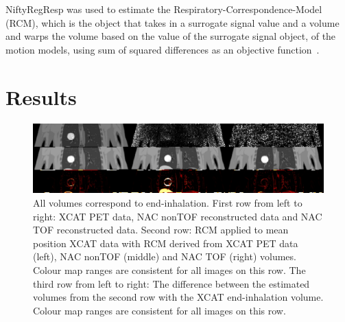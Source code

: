 \documentclass{IEEEtran}
\begin{document}
NiftyRegResp was used to estimate the Respiratory-Correspondence-Model (RCM), which is the object that takes in a surrogate signal value and a volume and warps the volume based on the value of the surrogate signal object, of the motion models, using sum of squared differences as an objective function~\cite{McClelland2017}.

\vspace{-0.2cm}

\section{Results}
\begin{figure}
    \vspace{-0.2cm}
    
    \centering
    \includegraphics[width=0.9\linewidth]{figures/output_flipped.png}
    \caption{All volumes correspond to end-inhalation. First row from left to right: XCAT PET data, NAC nonTOF reconstructed data and NAC TOF reconstructed data. Second row: RCM applied to mean position XCAT data with RCM derived from XCAT PET data (left), NAC nonTOF (middle) and NAC TOF (right) volumes. Colour map ranges are consistent for all images on this row. The third row from left to right: The difference between the estimated volumes from the second row with the XCAT end-inhalation volume. Colour map ranges are consistent for all images on this row.}
    \label{fig:output}
    
    \vspace{-0.2cm}
\end{figure}
\end{document}
